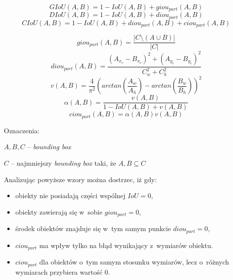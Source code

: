 \begin{equation}
GIoU(A,B) = 1 - IoU(A,B) + giou_{part}(A,B)
\label{eq:giou}
\end{equation}
\begin{equation}
DIoU(A,B) = 1 - IoU(A,B) + diou_{part}(A,B)
\label{eq:diou}
\end{equation}
\begin{equation}
CIoU(A,B) = 1 - IoU(A,B) + diou_{part}(A,B) + ciou_{part}(A,B)
\label{eq:ciou}
\end{equation}

\begin{equation}
giou_{part}(A,B) = \frac{|C \setminus (A \cup B)|}{|C|}
\label{eq:giou_part}
\end{equation}
\begin{equation}
diou_{part}(A,B) = \frac{(A_{x_c} - B_{x_c})^2 + (A_{y_c} - B_{y_c})^2}{C_w^2+C_h^2}
\label{eq:diou_part}
\end{equation}
\begin{equation}
v(A,B) = \frac{4}{\pi^2} (arctan(\frac{A_w}{A_h}) - arctan(\frac{B_w}{B_h}))^2
\label{eq:ciou_v}
\end{equation}
\begin{equation}
\alpha(A,B) = \frac{v(A,B)}{1 - IoU(A,B) + v(A,B)}
\label{eq:ciou_alpha}
\end{equation}
\begin{equation}
ciou_{part}(A,B) = \alpha(A,B) v(A,B)
\label{eq:ciou_part}
\end{equation}


Oznaczenia:
\begin{description}
\item $A, B, C$ -- \emph{bounding box}
\item $C$ -- najmniejszy \emph{bounding box} taki, że $A,B \subseteq C$
\end{description}

Analizując powyższe wzory można dostrzec, iż gdy:
\begin{itemize}
\item obiekty nie posiadają  części wspólnej $IoU = 0$,
\item obiekty zawierają się w~sobie $giou_{part} = 0$,
\item środek obiektów znajduje się w~tym samym punkcie $diou_{part} = 0$,  
\item $ciou_{part}$ ma wpływ tylko na błąd wynikający z~wymiarów obiektu. 
\item $ciou_{part}$ dla obiektów o~tym samym stosunku wymiarów, lecz o~różnych wymiarach przybiera wartość $0$. 
\end{itemize}

